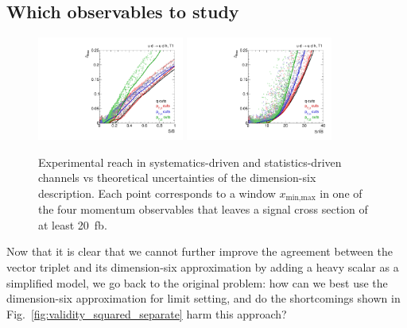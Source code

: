 \subsection{Which observables to study}

\begin{figure}[t]
  \includegraphics[width=0.43\textwidth]{fig/validity/WBF_cuts_T1_SB.pdf}
  \hspace*{0.05\textwidth}
  \includegraphics[width=0.43\textwidth]{fig/validity/WBF_cuts_T1_SsqrtB.pdf}
  \caption{Experimental reach in systematics-driven and
    statistics-driven channels vs theoretical uncertainties of the
    dimension-six description. Each point corresponds to a window
    $x_\text{min,max}$ in one of the four momentum observables that leaves a signal
    cross section of at least 20~fb.}
  \label{fig:validity_cuts}
\end{figure}

Now that it is clear that we cannot further improve the agreement
between the vector triplet and its dimension-six approximation by adding
a heavy scalar as a simplified model, we go back to the original
problem: how can we best use the dimension-six approximation for limit
setting, and do the shortcomings shown in
Fig.~\ref{fig:validity_squared_separate} harm this approach?

